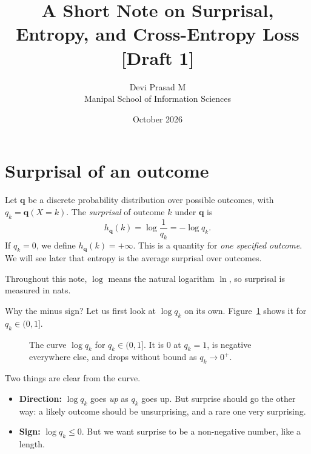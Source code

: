 \documentclass[12pt,a4paper]{article}
\title{A Short Note on Surprisal, Entropy, and Cross-Entropy Loss\\\vspace*{2pt}[Draft 1]}
\author{Devi Prasad M\\Manipal School of Information Sciences}
\date{October 2026}
\begin{document}
\maketitle

\section{Surprisal of an outcome}

Let $\symbf{q}$ be a discrete probability distribution over
possible outcomes, with $q_k = \symbf{q}(X = k)$.
The \emph{surprisal} of outcome $k$ under $\symbf{q}$ is
\begin{equation}
  h_{\symbf{q}}(k) = \log \dfrac{1}{q_k} = -\log q_k.
  \label{eq:surprisal}
\end{equation}
If $q_k = 0$, we define $h_{\symbf{q}}(k) = +\infty$.
This is a quantity for \emph{one specified outcome}.
We will see later that entropy is the average surprisal
over outcomes.

Throughout this note, $\log$ means the natural logarithm
$\ln$, so surprisal is measured in nats.

Why the minus sign? Let us first look at $\log q_k$
on its own. Figure~\ref{fig:ln} shows it for $q_k \in (0, 1]$.

\begin{figure}[ht]
  \centering
  \caption{The curve $\log q_k$ for $q_k \in (0, 1]$.
  It is $0$ at $q_k = 1$, is negative everywhere
  else, and drops without bound as $q_k \to 0^{+}$.}
  \label{fig:ln}
\end{figure}

Two things are clear from the curve.

\begin{itemize}
  \item \textbf{Direction:} $\log q_k$ goes
  \emph{up} as $q_k$ goes up. But surprise should
  go the other way: a likely outcome should be
  unsurprising, and a rare one very surprising.
  \item \textbf{Sign:} $\log q_k \le 0$. But we
  want surprise to be a non-negative number,
  like a length.
\end{itemize}
\end{document}
